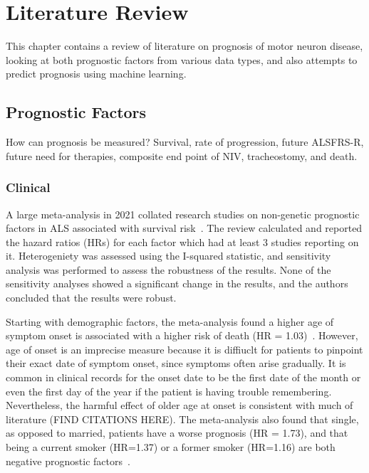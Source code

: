 \chapter{Literature Review}
\label{literature_review}

This chapter contains a review of literature on prognosis of motor neuron disease, looking at both prognostic factors from various data types, and also attempts to predict prognosis using machine learning.

\section{Prognostic Factors}

How can prognosis be measured? Survival, rate of progression, future ALSFRS-R, future need for therapies, composite end point of NIV, tracheostomy, and death.

\subsection{Clinical}

A large meta-analysis in 2021 collated research studies on non-genetic prognostic factors in ALS associated with survival risk~\cite{suPredictorsSurvivalPatients2021}.
The review calculated and reported the hazard ratios (HRs) for each factor which had at least 3 studies reporting on it. Heterogeniety was assessed using the I-squared statistic, and sensitivity analysis was performed to assess the robustness of the results.
None of the sensitivity analyses showed a significant change in the results, and the authors concluded that the results were robust.

Starting with demographic factors, the meta-analysis found a higher age of symptom onset is associated with a higher risk of death (HR = 1.03)~\cite{suPredictorsSurvivalPatients2021}. However, age of onset is an imprecise measure because it is diffiuclt for patients to pinpoint their exact date of symptom onset, since symptoms often arise gradually.
It is common in clinical records for the onset date to be the first date of the month or even the first day of the year if the patient is having trouble remembering. Nevertheless, the harmful effect of older age at onset is consistent with much of literature (FIND CITATIONS HERE).
The meta-analysis also found that single, as opposed to married, patients have a worse prognosis (HR = 1.73), and that being a current smoker (HR=1.37) or a former smoker (HR=1.16) are both negative prognostic factors~\cite{suPredictorsSurvivalPatients2021}.

